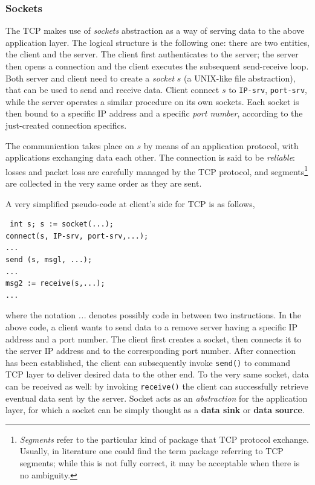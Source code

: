 \documentclass[10pt]{extbook}
\begin{document}
\subsubsection{Sockets}

The TCP makes use of \emph{sockets} abstraction as a way of serving data to the
above application layer. The logical structure is the following one: there are
two entities, the client and the server. The client first authenticates to the
server; the server then opens a connection and the client executes the
subsequent send-receive loop. Both server and client need to create a
\emph{socket} $s$ (a UNIX-like file abstraction), that can be used to send and
receive data. Client connect $s$ to \texttt{IP-srv}, \texttt{port-srv}, while
the server operates a similar procedure on its own sockets. Each socket is then
bound to a specific IP address and a specific \emph{port number}, according to
the just-created connection specifics.

The communication takes place on $s$ by means of an application protocol, with
applications exchanging data each other. The connection is said to be
\emph{reliable}: losses and packet loss are carefully managed by the TCP
protocol, and segments\footnote{\emph{Segments} refer to the particular kind of
package that TCP protocol exchange. Usually, in literature one could find the
term package referring to TCP segments; while this is not fully correct, it may
be acceptable when there is no ambiguity.} are collected in the very same order
as they are sent.

A very simplified pseudo-code at client's side for TCP is as follows,

\begin{verbatim} int s; s := socket(...); 
connect(s, IP-srv, port-srv,...); 
...
send (s, msgl, ...); 
... 
msg2 := receive(s,...); 
... 
\end{verbatim}

where the notation \emph{...} denotes possibly code in between two
instructions. In the above code, a client wants to send data to a remove server
having a specific IP address and a port number. The client first creates a
socket, then connects it to the server IP address and to the corresponding port
number. After connection has been established, the client can subsequently
invoke \texttt{send()} to command TCP layer to deliver desired data to the
other end. To the very same socket, data can be received as well: by invoking
\texttt{receive()} the client can successfully retrieve eventual data sent by
the server. Socket acts as an \emph{abstraction} for the application layer, for
which a socket can be simply thought as a \textbf{data sink} or \textbf{data
source}.
\end{document}
